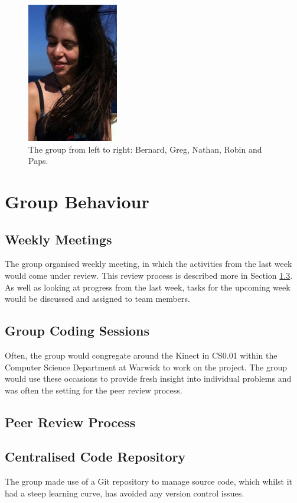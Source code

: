 \begin{figure}[h]
\begin{center}
\includegraphics[scale=0.5]{./pm/stef} 
\end{center}
\caption{The group from left to right: Bernard, Greg, Nathan, Robin and Paps.}
\label{fig:the group}
\end{figure}

\section{Group Behaviour}

\subsection{Weekly Meetings}
The group organised weekly meeting, in which the activities from the last week would come under review. This review process is described more in Section \ref{pm:peer review process}.
As well as looking at progress from the last week, tasks for the upcoming week would be discussed and assigned to team members.\\

\subsection{Group Coding Sessions}
Often, the group would congregate around the Kinect in CS0.01 within the Computer Science Department at Warwick to work on the project. The group would use these occasions to provide fresh insight into individual problems and was often the setting for the peer review process.\\

\subsection{Peer Review Process}
\label{pm:peer review process}


\subsection{Centralised Code Repository}
The group made use of a Git repository to manage source code, which whilst it had a steep learning curve, has avoided any version control issues.

